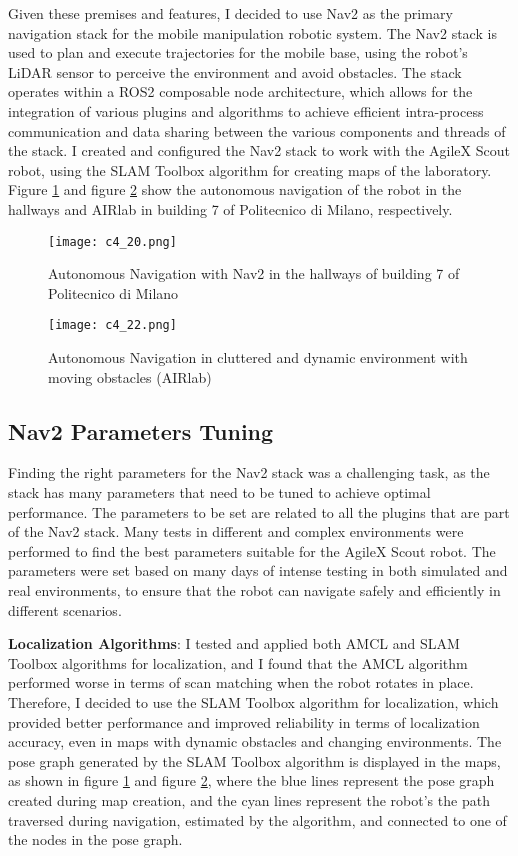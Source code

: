 Given these premises and features, I decided to use Nav2 as the primary navigation stack for the mobile manipulation
robotic system. The Nav2 stack is used to plan and execute trajectories for the mobile base, using the robot's
LiDAR sensor to perceive the environment and avoid obstacles. The stack operates within a ROS2 
composable node architecture, which allows for the integration of various plugins and algorithms to achieve
efficient intra-process communication and data sharing between the various components and threads of the stack.
I created and configured the Nav2 stack to work with the AgileX Scout robot, using the SLAM Toolbox algorithm
for creating maps of the laboratory. Figure \ref{fig:nav2_hallway} and figure \ref{fig:nav2_airlab} show the autonomous
navigation of the robot in the hallways and AIRlab in building 7 of Politecnico di Milano, respectively.

\begin{figure}[t]
    \centering
    \texttt{[image: c4\_20.png]}
    \caption{Autonomous Navigation with Nav2 in the hallways of building 7 of Politecnico di Milano}
    \label{fig:nav2_hallway}
\end{figure}

\begin{figure}[t]
    \centering
    \texttt{[image: c4\_22.png]}
    \caption{Autonomous Navigation in cluttered and dynamic environment with moving obstacles (AIRlab)}
    \label{fig:nav2_airlab}
\end{figure}

\subsection{Nav2 Parameters Tuning}

Finding the right parameters for the Nav2 stack was a challenging task, as the stack has many parameters that need
to be tuned to achieve optimal performance. The parameters to be set are related to all the plugins that are part
of the Nav2 stack. Many tests in different and complex environments were performed to find the best parameters
suitable for the AgileX Scout robot. The parameters were set based on many days of intense testing in both simulated
and real environments, to ensure that the robot can navigate safely and efficiently in different scenarios.

\textbf{Localization Algorithms}:
I tested and applied both AMCL and SLAM Toolbox algorithms for localization, and I found that the AMCL algorithm
performed worse in terms of scan matching when the robot rotates in place. Therefore, I decided to use the SLAM Toolbox
algorithm for localization, which provided better performance and improved reliability in terms of localization accuracy,
even in maps with dynamic obstacles and changing environments. The pose graph generated by the SLAM Toolbox algorithm
is displayed in the maps, as shown in figure \ref{fig:nav2_hallway} and figure \ref{fig:nav2_airlab}, where the
blue lines represent the pose graph created during map creation, and the cyan lines represent the robot's
the path traversed during navigation, estimated by the algorithm, and connected to one of the nodes in the pose graph.

